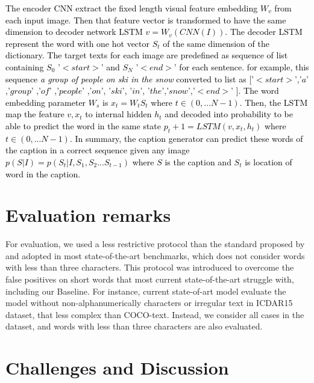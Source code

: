\documentclass[phd,tocprelim]{cornell}
\begin{document}
\textcolor{black}{The encoder CNN extract the fixed length visual feature embedding $W_{v}$ from each input image. Then that feature vector is transformed to have the same dimension to decoder network LSTM $v = W_{v}(CNN(I))$.  The decoder LSTM represent the word with one hot vector $S_{t}$ of the same dimension of the dictionary.  The target texts for each image are predefined as sequence of list containing $S_{0}$ '$<start>$'  and $S_{N}$ '$<end>$' for each sentence. for example, this sequence \textit{a group of people on ski in the snow} converted to list as  ['$<start>$','$a$' ,'$group$' ,'$of$' ,'$people$' ,'$on$', '$ski$', '$in$', '$the$','$snow$','$<end>$' ]. The word embedding parameter $W_{s}$  is $x_{t} = W_{t}S_{t}$ where $t \in {(0,... N-1)}$. Then, the LSTM map the feature $v, x_{t}$ to internal hidden $h_{t}$ and decoded into probability to be able to predict the word in the same state $p_{t}+1 = LSTM(v,x_{t},h_{t})$ where  $t \in {(0,... N-1)}$. In summary, the caption generator can predict these words of the caption in a correct sequence given any image $p(S|I) = p(S_{t}|I, S_{1}, S_{2} ... S_{t-1})$  where $S$ is the caption and $S_{t}$ is location of word in the caption.}  





\section{Evaluation remarks} 
For evaluation, we used a less restrictive protocol than the standard proposed by \cite{wang2010word} and adopted in most state-of-the-art benchmarks, which does not consider words with less than three characters. This protocol was introduced to overcome the false positives on short words that most current state-of-the-art struggle with, including our Baseline. For instance, current state-of-art model \cite{fang2018attention} evaluate the model without non-alphanumerically characters or irregular text in ICDAR15 dataset, that less complex than COCO-text. Instead, we consider all cases in the dataset, and words with less than three characters are also evaluated.


\section{Challenges and Discussion}
\end{document}
